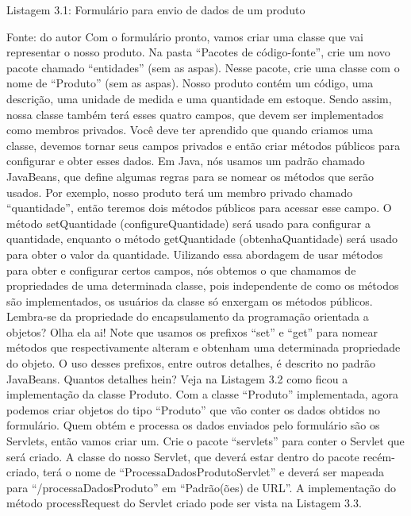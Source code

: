 
























Listagem 3.1: Formulário para envio de dados de um produto
 
Fonte: do autor
Com o formulário pronto, vamos criar uma classe que vai representar o nosso produto. Na pasta “Pacotes de código-fonte”, crie um novo pacote chamado “entidades” (sem as aspas). Nesse pacote, crie uma classe com o nome de “Produto” (sem as aspas). Nosso produto contém um código, uma descrição, uma unidade de medida e uma quantidade em estoque. Sendo assim, nossa classe também terá esses quatro campos, que devem ser implementados como membros privados. Você deve ter aprendido que quando criamos uma classe, devemos tornar seus campos privados e então criar métodos públicos para configurar e obter esses dados. Em Java, nós usamos um padrão chamado JavaBeans, que define algumas regras para se nomear os métodos que serão usados. Por exemplo, nosso produto terá um membro privado chamado “quantidade”, então teremos dois métodos públicos para acessar esse campo. O método setQuantidade (configureQuantidade) será usado para configurar a quantidade, enquanto o método getQuantidade (obtenhaQuantidade) será usado para obter o valor da quantidade. Uilizando essa abordagem de usar métodos para obter e configurar certos campos, nós obtemos o que chamamos de propriedades de uma determinada classe, pois independente de como os métodos são implementados, os usuários da classe só enxergam os métodos públicos. Lembra-se da propriedade do encapsulamento da programação orientada a objetos? Olha ela ai! Note que usamos os prefixos “set” e “get” para nomear métodos que respectivamente alteram e obtenham uma determinada propriedade do objeto. O uso desses prefixos, entre outros detalhes, é descrito no padrão JavaBeans.
Quantos detalhes hein? Veja na Listagem 3.2 como ficou a implementação da classe Produto.
Com a classe “Produto” implementada, agora podemos criar objetos do tipo “Produto” que vão conter os dados obtidos no formulário. Quem obtém e processa os dados enviados pelo formulário são os Servlets, então vamos criar um. Crie o pacote “servlets” para conter o Servlet que será criado. A classe do nosso Servlet, que deverá estar dentro do pacote recém-criado, terá o nome de “ProcessaDadosProdutoServlet” e deverá ser mapeada para “/processaDadosProduto” em “Padrão(ões) de URL”. A implementação do método processRequest do Servlet criado pode ser vista na Listagem 3.3.









